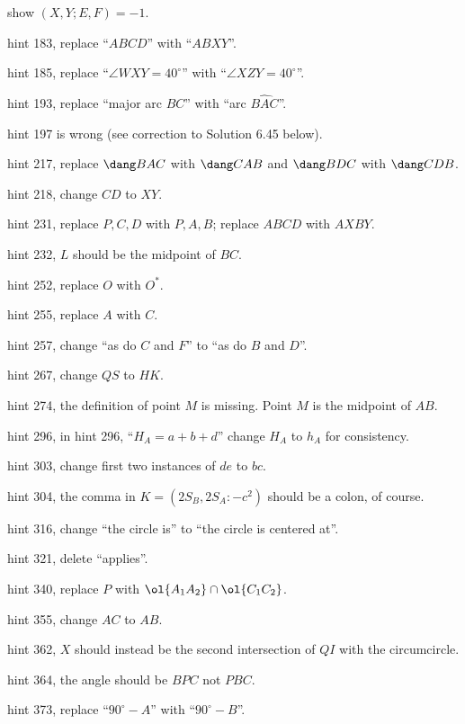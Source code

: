 \documentclass[11pt]{scrartcl}
\begin{document}
\begin{description}
  show $(X,Y;E,F) = -1$.
\item[p.\  226] hint 183, replace ``$ABCD$'' with ``$ABXY$''.
\item[p.\  226] hint 185, replace ``$\angle WXY = 40^{\circ}$''
  with ``$\angle XZY = 40^{\circ}$''.
\item[p.\  226] hint 193, replace ``major arc $BC$'' with ``arc $\widehat{BAC}$''.
\item[p.\  226] hint 197 is wrong (see correction to Solution 6.45 below).
\item[p.\  226] hint 217, replace $\dang BAC$ with $\dang CAB$ and $\dang BDC$ with $\dang CDB$.
\item[p.\  226] hint 218, change $CD$ to $XY$.
\item[p.\  227] hint 231, replace $P,C,D$ with $P,A,B$; replace $ABCD$ with $AXBY$.
\item[p.\  227] hint 232, $L$ should be the midpoint of $BC$.
\item[p.\  227] hint 252, replace $O$ with $O^\ast$.
\item[p.\  227] hint 255, replace $A$ with $C$.
\item[p.\  228] hint 257, change ``as do $C$ and $F$'' to ``as do $B$ and $D$''.
\item[p.\  228] hint 267, change $QS$ to $HK$.
\item[p.\  228] hint 274, the definition of point $M$ is missing.
  Point $M$ is the midpoint of $AB$.
\item[p.\  229] hint 296, in hint 296, ``$H_A = a + b + d$'' change $H_A$ to $h_A$ for consistency.
\item[p.\  229] hint 303, change first two instances of $de$ to $bc$.
\item[p.\  229] hint 304, the comma in $K = (2S_B, 2S_A: -c^2)$ should be a colon, of course.
\item[p.\  229] hint 316, change ``the circle is'' to ``the circle is centered at''.
\item[p.\  229] hint 321, delete ``applies''.
\item[p.\  230] hint 340, replace $P$ with $\ol{A_1A_2} \cap \ol{C_1C_2}$.
\item[p.\  230] hint 355, change $AC$ to $AB$.
\item[p.\  230] hint 362, $X$ should instead be the second intersection
  of $QI$ with the circumcircle.
\item[p.\  230] hint 364, the angle should be $BPC$ not $PBC$.
\item[p.\  231] hint 373, replace ``$90^{\circ}-A$'' with ``$90^{\circ}-B$''.

\end{description}
\end{document}

